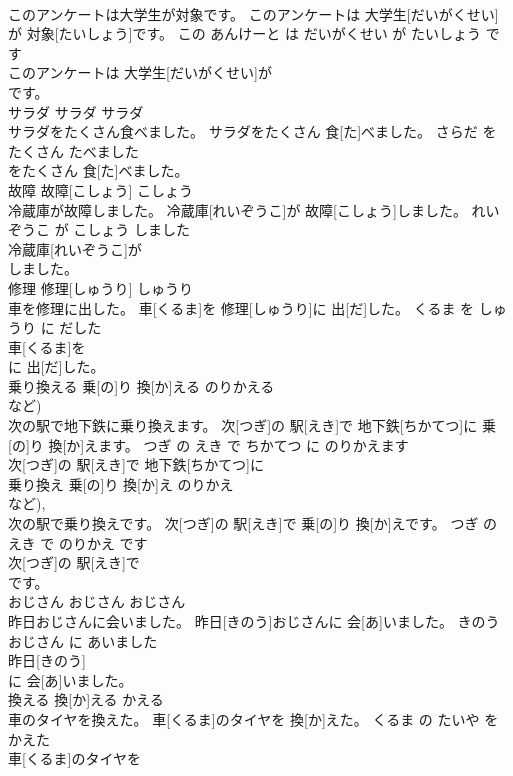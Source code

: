 \documentclass[8pt]{extreport}
\begin{document}
\begin{CJK}{UTF8}{min}
\\	このアンケートは大学生が対象です。	このアンケートは 大学生[だいがくせい]が 対象[たいしょう]です。	この あんけーと は だいがくせい が たいしょう です	
\\	このアンケートは 大学生[だいがくせい]が
\\	です。		
\\	サラダ	サラダ	サラダ	
\\	サラダをたくさん食べました。	サラダをたくさん 食[た]べました。	さらだ を たくさん たべました	
\\	をたくさん 食[た]べました。		
\\	故障	故障[こしょう]	こしょう	
\\	冷蔵庫が故障しました。	冷蔵庫[れいぞうこ]が 故障[こしょう]しました。	れいぞうこ が こしょう しました	
\\	冷蔵庫[れいぞうこ]が
\\	しました。		
\\	修理	修理[しゅうり]	しゅうり	
\\	車を修理に出した。	車[くるま]を 修理[しゅうり]に 出[だ]した。	くるま を しゅうり に だした	
\\	車[くるま]を
\\	に 出[だ]した。		
\\	乗り換える	乗[の]り 換[か]える	のりかえる	
\\	など)		
\\	次の駅で地下鉄に乗り換えます。	次[つぎ]の 駅[えき]で 地下鉄[ちかてつ]に 乗[の]り 換[か]えます。	つぎ の えき で ちかてつ に のりかえます	
\\	次[つぎ]の 駅[えき]で 地下鉄[ちかてつ]に
\\	乗り換え	乗[の]り 換[か]え	のりかえ	
\\	など), 
\\	次の駅で乗り換えです。	次[つぎ]の 駅[えき]で 乗[の]り 換[か]えです。	つぎ の えき で のりかえ です	
\\	次[つぎ]の 駅[えき]で
\\	です。		
\\	おじさん	おじさん	おじさん	
\\	昨日おじさんに会いました。	昨日[きのう]おじさんに 会[あ]いました。	きのう おじさん に あいました	
\\	昨日[きのう]
\\	に 会[あ]いました。		
\\	換える	換[か]える	かえる	
\\	車のタイヤを換えた。	車[くるま]のタイヤを 換[か]えた。	くるま の たいや を かえた	
\\	車[くるま]のタイヤを

\end{CJK}
\end{document}
